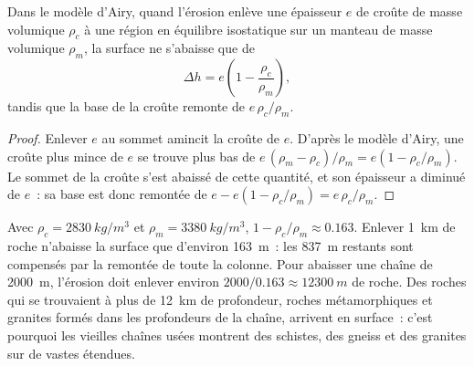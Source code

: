\begin{proposition}\label{prop:g12:destruction-of-mountains:rebound}
Dans le modèle d'Airy, quand l'érosion enlève une épaisseur $e$ de croûte
de masse volumique $\rho_c$ à une région en équilibre isostatique sur un
manteau de masse volumique $\rho_m$, la surface ne s'abaisse que de
\[
  \Delta h = e\left(1 - \frac{\rho_c}{\rho_m}\right),
\]
tandis que la base de la croûte remonte de $e\,\rho_c/\rho_m$.
\end{proposition}

\begin{proof}
Enlever $e$ au sommet amincit la croûte de $e$. D'après le modèle d'Airy,
une croûte plus mince de $e$ se trouve plus bas de $e\,(\rho_m - \rho_c)/\rho_m = e(1 -
\rho_c/\rho_m)$. Le sommet de la croûte s'est abaissé de cette quantité, et
son épaisseur a diminué de $e$~: sa base est donc remontée de $e - e(1 -
\rho_c/\rho_m) = e\,\rho_c/\rho_m$.
\end{proof}

Avec $\rho_c = \qty{2830}{kg/m^3}$ et $\rho_m = \qty{3380}{kg/m^3}$, $1 -
\rho_c/\rho_m \approx 0.163$. Enlever \qty{1}{km} de roche n'abaisse la
surface que d'environ \qty{163}{m}~: les \qty{837}{m} restants sont
compensés par la remontée de toute la colonne. Pour abaisser une chaîne de
\qty{2000}{m}, l'érosion doit enlever environ
$2000/0.163 \approx \qty{12300}{m}$ de roche. Des roches qui se trouvaient
à plus de \qty{12}{km} de profondeur, roches métamorphiques et granites
formés dans les profondeurs de la chaîne, arrivent en surface~: c'est
pourquoi les vieilles chaînes usées montrent des schistes, des gneiss et
des granites sur de vastes étendues.

